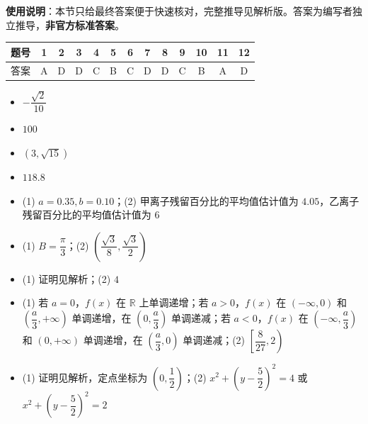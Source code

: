 
\begin{gknotice}
\textbf{使用说明}：本节只给最终答案便于快速核对，完整推导见解析版。答案为编写者独立推导，\textbf{非官方标准答案}。
\end{gknotice}

\begin{center}\begin{tabular}{ccccccccccccc}
\toprule
题号 & 1 & 2 & 3 & 4 & 5 & 6 & 7 & 8 & 9 & 10 & 11 & 12 \\
\midrule
答案 & A & D & D & C & B & C & D & D & C & B & A & D \\
\bottomrule
\end{tabular}\end{center}

\begin{itemize}[leftmargin=2.6em]
  \item[\textbf{13.}] $-\dfrac{\sqrt{2}}{10}$
  \item[\textbf{14.}] $100$
  \item[\textbf{15.}] $(3, \sqrt{15})$
  \item[\textbf{16.}] $118.8$
\end{itemize}

\begin{itemize}[leftmargin=2.6em]
  \item[\textbf{17.}] (1) $a = 0.35, b = 0.10$；(2) 甲离子残留百分比的平均值估计值为 $4.05$，乙离子残留百分比的平均值估计值为 $6$
  \item[\textbf{18.}] (1) $B = \dfrac{\pi}{3}$；(2) $\left(\dfrac{\sqrt{3}}{8}, \dfrac{\sqrt{3}}{2}\right)$
  \item[\textbf{19.}] (1) 证明见解析；(2) $4$
  \item[\textbf{20.}] (1) 若 $a = 0$，$f(x)$ 在 $\mathbb{R}$ 上单调递增；若 $a > 0$，$f(x)$ 在 $(-\infty, 0)$ 和 $\left(\dfrac{a}{3}, +\infty\right)$ 单调递增，在 $\left(0, \dfrac{a}{3}\right)$ 单调递减；若 $a < 0$，$f(x)$ 在 $\left(-\infty, \dfrac{a}{3}\right)$ 和 $(0, +\infty)$ 单调递增，在 $\left(\dfrac{a}{3}, 0\right)$ 单调递减；(2) $\left[\dfrac{8}{27}, 2\right)$
  \item[\textbf{21.}] (1) 证明见解析，定点坐标为 $\left(0, \dfrac{1}{2}\right)$；(2) $x^2 + \left(y - \dfrac{5}{2}\right)^2 = 4$ 或 $x^2 + \left(y - \dfrac{5}{2}\right)^2 = 2$
\end{itemize}

